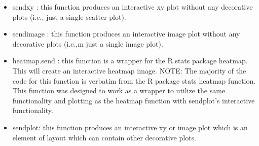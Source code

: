 \documentclass[]{article}
\begin{document}
\begin{itemize}
\item sendxy : this function produces an interactive xy plot without any decorative plots (i.e., just a single scatter-plot).
\item sendimage :  this function produces an interactive image plot without any decorative plots (i.e.,m just a single image plot).
\item heatmap.send : this function is a wrapper for the R stats package heatmap. This will
create an interactive heatmap image. NOTE: The majority of the code for
this function is verbatim from the R package stats heatmap
function. This function was designed to work as a wrapper to utilize
the same functionality and plotting as the heatmap function with
sendplot's interactive functionality.
\item sendplot: this function produces an interactive xy or image plot which is an element of layout which can contain other decorative plots. 
\end{itemize}
\end{document}
